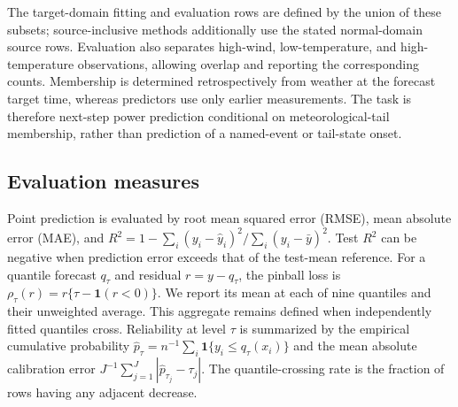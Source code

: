 \documentclass[a4paper]{cas-sc}
\begin{document}
{\color{blue}The target-domain fitting and evaluation rows are defined by the union of these subsets; source-inclusive methods additionally use the stated normal-domain source rows. Evaluation also separates high-wind, low-temperature, and high-temperature observations, allowing overlap and reporting the corresponding counts. Membership is determined retrospectively from weather at the forecast target time, whereas predictors use only earlier measurements. The task is therefore next-step power prediction conditional on meteorological-tail membership, rather than prediction of a named-event or tail-state onset.}



\subsection{Evaluation measures}\label{sec:setup}

{\color{blue}Point prediction is evaluated by root mean squared error (RMSE), mean absolute error (MAE), and $R^2=1-\sum_i(y_i-\hat y_i)^2/\sum_i(y_i-\bar y)^2$. Test $R^2$ can be negative when prediction error exceeds that of the test-mean reference. For a quantile forecast $q_\tau$ and residual $r=y-q_\tau$, the pinball loss is $\rho_\tau(r)=r\{\tau-\mathbf{1}(r<0)\}$. We report its mean at each of nine quantiles and their unweighted average. This aggregate remains defined when independently fitted quantiles cross. Reliability at level $\tau$ is summarized by the empirical cumulative probability $\widehat p_\tau=n^{-1}\sum_i\mathbf{1}\{y_i\le q_\tau(x_i)\}$ and the mean absolute calibration error $J^{-1}\sum_{j=1}^J|\widehat p_{\tau_j}-\tau_j|$. The quantile-crossing rate is the fraction of rows having any adjacent decrease.}
\end{document}
